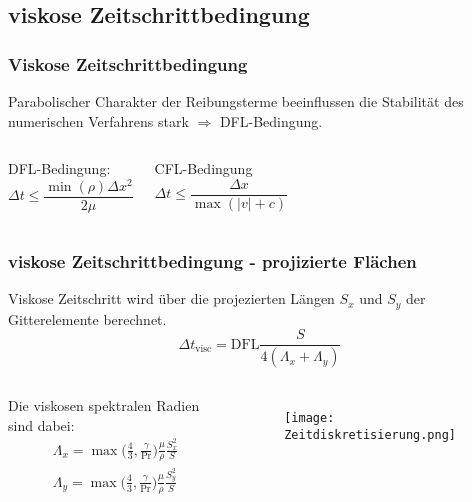 \documentclass[
	11pt, %
	aspectratio=169, %
]{beamer}
\begin{document}
\subsection{viskose Zeitschrittbedingung}
\begin{frame}
	\frametitle{Viskose Zeitschrittbedingung}
	Parabolischer Charakter der Reibungsterme beeinflussen die Stabilität des numerischen Verfahrens stark
	$\Rightarrow$ DFL-Bedingung.
	\newline


	\begin{columns}
		DFL-Bedingung:
		\begin{equation}
			\Delta t \leq \frac{\min(\rho)\Delta x^2}{2\mu}
		\end{equation} 

		CFL-Bedingung
		\begin{equation}
			\Delta t \leq \frac{\Delta x}{\max (|v|+c)}
		\end{equation}
			
		
	\end{columns}



\end{frame}


\begin{frame}
	\frametitle{viskose Zeitschrittbedingung - projizierte Flächen}

	Viskose Zeitschritt wird über die projezierten Längen $S_x$ und $S_y$ der Gitterelemente berechnet.
	\begin{equation}
		\Delta t_{\mathrm{visc}} = \mathrm{DFL}\frac{S}{4(\Lambda_x+\Lambda_y)}
	\end{equation}

	\begin{columns}
		\column{0.6 \textwidth}
			Die viskosen spektralen Radien sind dabei:
			\begin{align}
				\Lambda_x = \max\biggl(\frac{4}{3}, \frac{\gamma}{\mathrm{Pr}} \biggr) \frac{\mu}{\rho} \frac{S_x^2}{S} \\
				\Lambda_y = \max\biggl(\frac{4}{3}, \frac{\gamma}{\mathrm{Pr}} \biggr) \frac{\mu}{\rho} \frac{S_y^2}{S}
			\end{align}
		\column{0.4 \textwidth}

		\begin{figure}
			\texttt{[image: Zeitdiskretisierung.png]}
		\end{figure}
	\end{columns}

\end{frame}
\end{document}
